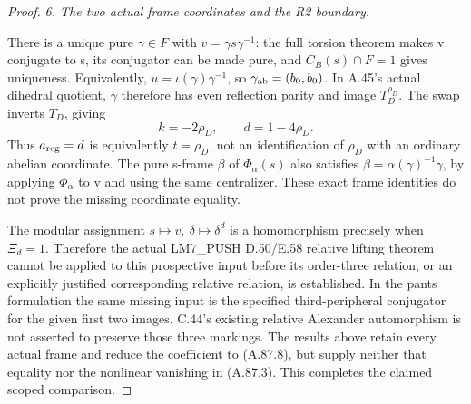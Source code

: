 \begin{proof}
\emph{6. The two actual frame coordinates and the R2 boundary.}\par
There is a unique pure \(\gamma\in F\) with
\(v=\gamma s\gamma^{-1}\): the full torsion theorem makes v
conjugate to s, its conjugator can be made pure, and
\(C_B(s)\cap F=1\) gives uniqueness. Equivalently,
\(u=\iota(\gamma)\gamma^{-1}\), so
\(\gamma_{\rm ab}=(b_0,b_0)\). In A.45's actual dihedral quotient,
\(\gamma\) therefore has even reflection parity and image
\(T_D^{\rho_D}\). The swap inverts \(T_D\), giving
\[
                k=-2\rho_D,\qquad d=1-4\rho_D.
 \tag{A.87.17}
\]
Thus \(a_{\rm reg}=d\) is equivalently \(t=\rho_D\), not an
identification of \(\rho_D\) with an ordinary abelian coordinate.
The pure s-frame \(\beta\) of \(\Phi_\alpha(s)\) also satisfies
\(\beta=\alpha(\gamma)^{-1}\gamma\), by applying
\(\Phi_\alpha\) to v and using the same centralizer. These exact
frame identities do not prove the missing coordinate equality.

The modular assignment \(s\mapsto v,\ \delta\mapsto\delta^d\)
is a homomorphism precisely when \(\Xi_d=1\). Therefore the
actual LM7\_PUSH D.50/E.58 relative lifting theorem cannot be
applied to this prospective input before its order-three relation,
or an explicitly justified corresponding relative relation, is
established. In the pants formulation the same missing input is
the specified third-peripheral conjugator for the given first two
images. C.44's existing relative Alexander automorphism is not
asserted to preserve those three markings. The results above
retain every actual frame and reduce the coefficient to (A.87.8),
but supply neither that equality nor the nonlinear vanishing in
(A.87.3). This completes the claimed scoped comparison.
\end{proof}
